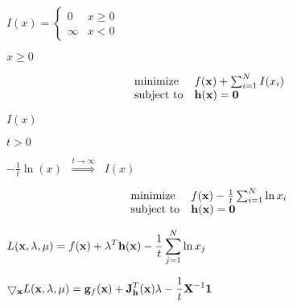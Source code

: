 \documentclass{article}
\def\lthtmlcheckvsize{\ifdim\ht\sizebox<\vsize 
  \ifdim\wd\sizebox<\hsize\expandafter\hfill\fi \expandafter\vfill
  \else\expandafter\vss\fi}%
\begin{document}
{\newpage\clearpage
{}%
$\displaystyle I(x)=\left\{\begin{array}{ll}0 & x\ge 0\\\infty& x<0\end{array}
\right.$%
\lthtmlindisplaymathZ
\lthtmlcheckvsize\clearpage}

{\newpage\clearpage
{}%
$ x\ge 0$%
\lthtmlindisplaymathZ
\lthtmlcheckvsize\clearpage}

{\newpage\clearpage
{}%
\begin{displaymath}\begin{array}{ll}
\mbox{minimize} & f({\bf x})+\sum_{i=1}^N I(x_i)\\
\mbox{subject to} & {\bf h}({\bf x})={\bf0}
\end{array}\end{displaymath}%
\lthtmldisplayZ
\lthtmlcheckvsize\clearpage}

{\newpage\clearpage
{}%
$ I(x)$%
\lthtmlindisplaymathZ
\lthtmlcheckvsize\clearpage}

{\newpage\clearpage
{}%
$ t>0$%
\lthtmlindisplaymathZ
\lthtmlcheckvsize\clearpage}

{\newpage\clearpage
{}%
$\displaystyle -\frac{1}{t}\ln(x)\;\;\stackrel{t\rightarrow\infty}{\Longrightarrow}\;\;I(x)$%
\lthtmlindisplaymathZ
\lthtmlcheckvsize\clearpage}

{\newpage\clearpage
{}%
\begin{displaymath}\begin{array}{ll}
\mbox{minimize} & f({\bf x})-\frac{1}{t}\sum_{i=1}^N\ln x_i\\
\mbox{subject to} & {\bf h}({\bf x})={\bf0}
\end{array}\end{displaymath}%
\lthtmldisplayZ
\lthtmlcheckvsize\clearpage}

{\newpage\clearpage
{}%
$\displaystyle L({\bf x},{\bf\lambda},{\bf\mu})=f({\bf x})
+{\bf\lambda}^T{\bf h}({\bf x})-\frac{1}{t}\sum_{j=1}^N\ln x_j\\$%
\lthtmlindisplaymathZ
\lthtmlcheckvsize\clearpage}

{\newpage\clearpage
{}%
$\displaystyle \bigtriangledown_{\bf x} L({\bf x},{\bf\lambda},{\bf\mu})
={\bf g}_f({\bf x})+{\bf J}_{\bf h}^T({\bf x}){\bf\lambda}
-\frac{1}{t}{\bf X}^{-1}{\bf 1}$%
\lthtmlindisplaymathZ
\lthtmlcheckvsize\clearpage}
\end{document}
